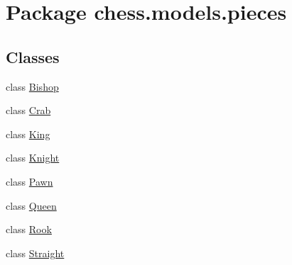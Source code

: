 \hypertarget{namespacechess_1_1models_1_1pieces}{}\section{Package chess.\+models.\+pieces}
\label{namespacechess_1_1models_1_1pieces}
\subsection*{Classes}
\begin{DoxyCompactItemize}
\item 
class \mbox{\hyperlink{classchess_1_1models_1_1pieces_1_1_bishop}{Bishop}}
\item 
class \mbox{\hyperlink{classchess_1_1models_1_1pieces_1_1_crab}{Crab}}
\item 
class \mbox{\hyperlink{classchess_1_1models_1_1pieces_1_1_king}{King}}
\item 
class \mbox{\hyperlink{classchess_1_1models_1_1pieces_1_1_knight}{Knight}}
\item 
class \mbox{\hyperlink{classchess_1_1models_1_1pieces_1_1_pawn}{Pawn}}
\item 
class \mbox{\hyperlink{classchess_1_1models_1_1pieces_1_1_queen}{Queen}}
\item 
class \mbox{\hyperlink{classchess_1_1models_1_1pieces_1_1_rook}{Rook}}
\item 
class \mbox{\hyperlink{classchess_1_1models_1_1pieces_1_1_straight}{Straight}}
\end{DoxyCompactItemize}
